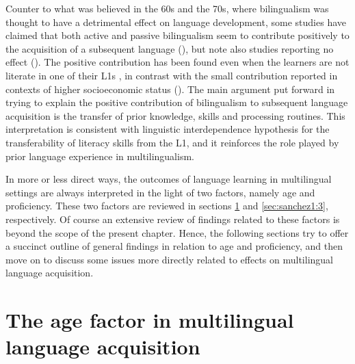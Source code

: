 \documentclass[output=paper,colorlinks,citecolor=brown,nonflat]{langsci/langscibook}
\begin{document}
Counter to what was believed in the 60s and the 70s, where bilingualism was thought to have a detrimental effect on language development, some studies have claimed that both active and passive bilingualism seem to contribute positively to the acquisition of a subsequent language (\citealt{CenozValencia1994, Muñoz2000, Sanz2000, Brohy2001}), but note also studies reporting no effect (\citealt{JaspaertLemmens1990, SandersMeijers1995}). The positive contribution has been found even when the learners are not literate in one of their L1s \citep{WagnerEtAl1989}, in contrast with the small contribution reported in contexts of higher socioeconomic status (\citealt{BenmamounEtAl2013, Polinsky2015}). The main argument put forward in trying to explain the positive contribution of bilingualism to subsequent language acquisition is the transfer of prior knowledge, skills and processing routines. This interpretation is consistent with  linguistic interdependence hypothesis for the transferability of literacy skills from the L1, and it reinforces the role played by prior language experience in multilingualism.

In more or less direct ways, the outcomes of language learning in multilingual settings are always interpreted in the light of two factors, namely age and proficiency. These two factors are reviewed in sections \ref{sec:sanchez1:2} and \ref{sec:sanchez1:3}, respectively. Of course an extensive review of findings related to these factors is beyond the scope of the present chapter. Hence, the following sections try to offer a succinct outline of general findings in relation to age and proficiency, and then move on to discuss some issues more directly related to effects on multilingual language acquisition.

\section{The age factor in multilingual language acquisition}\label{sec:sanchez1:2}
\end{document}

